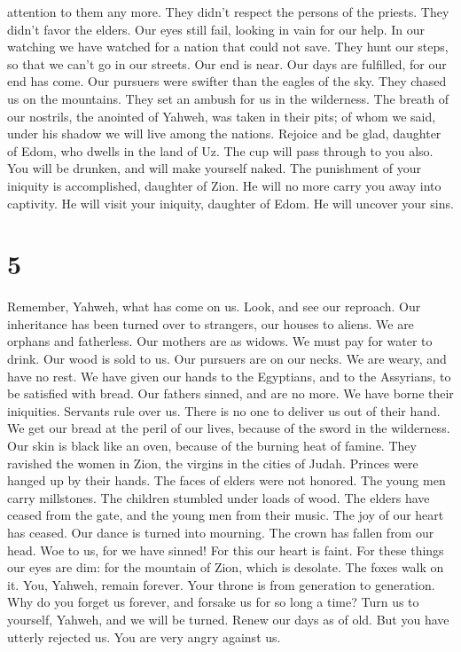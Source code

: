 attention to them any more. They didn't respect the persons of the
priests. They didn't favor the elders.  Our eyes still
fail, looking in vain for our help. In our watching we have watched for
a nation that could not save.  They hunt our steps, so that
we can't go in our streets. Our end is near. Our days are fulfilled, for
our end has come.  Our pursuers were swifter than the
eagles of the sky. They chased us on the mountains. They set an ambush
for us in the wilderness.  The breath of our nostrils, the
anointed of Yahweh, was taken in their pits; of whom we said, under his
shadow we will live among the nations.  Rejoice and be
glad, daughter of Edom, who dwells in the land of Uz. The cup will pass
through to you also. You will be drunken, and will make yourself naked.
 The punishment of your iniquity is accomplished, daughter
of Zion. He will no more carry you away into captivity. He will visit
your iniquity, daughter of Edom. He will uncover your sins.

\hypertarget{section-4}{%
\section{5}\label{section-4}}

 Remember, Yahweh, what has come on us. Look, and see our
reproach.  Our inheritance has been turned over to
strangers, our houses to aliens.  We are orphans and
fatherless. Our mothers are as widows.  We must pay for
water to drink. Our wood is sold to us.  Our pursuers are on
our necks. We are weary, and have no rest.  We have given
our hands to the Egyptians, and to the Assyrians, to be satisfied with
bread.  Our fathers sinned, and are no more. We have borne
their iniquities.  Servants rule over us. There is no one to
deliver us out of their hand.  We get our bread at the peril
of our lives, because of the sword in the wilderness.  Our
skin is black like an oven, because of the burning heat of famine.
 They ravished the women in Zion, the virgins in the cities
of Judah.  Princes were hanged up by their hands. The faces
of elders were not honored.  The young men carry
millstones. The children stumbled under loads of wood.  The
elders have ceased from the gate, and the young men from their music.
 The joy of our heart has ceased. Our dance is turned into
mourning.  The crown has fallen from our head. Woe to us,
for we have sinned!  For this our heart is faint. For these
things our eyes are dim:  for the mountain of Zion, which
is desolate. The foxes walk on it.  You, Yahweh, remain
forever. Your throne is from generation to generation.  Why
do you forget us forever, and forsake us for so long a time?
 Turn us to yourself, Yahweh, and we will be turned. Renew
our days as of old.  But you have utterly rejected us. You
are very angry against us.
